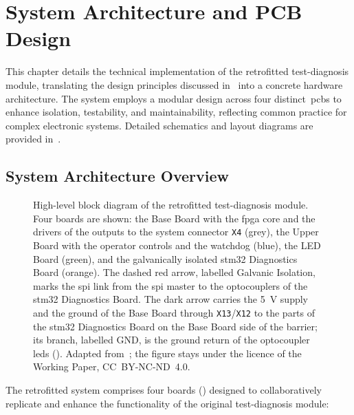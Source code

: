 \chapter{System Architecture and PCB Design}
\label{chap:architecture}

This chapter details the technical implementation of the retrofitted test-diagnosis module, translating the design principles discussed in~ into a concrete hardware architecture. The system employs a modular design across four distinct~\glspl{pcb} to enhance isolation, testability, and maintainability, reflecting common practice for complex electronic systems. Detailed schematics and layout diagrams are provided in~.

\section{System Architecture Overview}
\label{sec:overall_architecture}

\begin{figure}[htbp]
	\centering
	
	\caption[High-Level Block Diagram of the Retrofitted System]{High-level block diagram of the retrofitted test-diagnosis module. Four boards are shown: the Base Board with the \gls{fpga} core and the drivers of the outputs to the system connector \texttt{X4} (grey), the Upper Board with the operator controls and the watchdog (blue), the LED Board (green), and the galvanically isolated \gls{stm32} Diagnostics Board (orange). The dashed red arrow, labelled Galvanic Isolation, marks the \gls{spi} link from the \gls{spi} master to the optocouplers of the \gls{stm32} Diagnostics Board. The dark arrow carries the \SI{5}{\volt} supply and the ground of the Base Board through \texttt{X13}/\texttt{X12} to the parts of the \gls{stm32} Diagnostics Board on the Base Board side of the barrier; its branch, labelled GND, is the ground return of the optocoupler \glspl{led} (). Adapted from~\cite[Fig.~1]{torun2026}; the figure stays under the licence of the Working Paper, \mbox{CC~BY-NC-ND~4.0}.}
	\label{fig:overall_system}
\end{figure}

The retrofitted system comprises four boards () designed to collaboratively replicate and enhance the functionality of the original test-diagnosis module:

